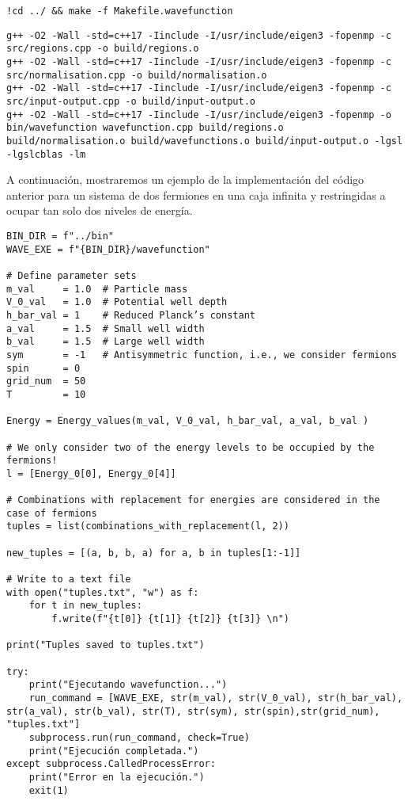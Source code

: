 \documentclass[11pt]{article}
\begin{document}
\begin{verbatim}
!cd ../ && make -f Makefile.wavefunction
\end{verbatim}

\label{orga623997}
\begin{verbatim}
g++ -O2 -Wall -std=c++17 -Iinclude -I/usr/include/eigen3 -fopenmp -c src/regions.cpp -o build/regions.o
g++ -O2 -Wall -std=c++17 -Iinclude -I/usr/include/eigen3 -fopenmp -c src/normalisation.cpp -o build/normalisation.o
g++ -O2 -Wall -std=c++17 -Iinclude -I/usr/include/eigen3 -fopenmp -c src/input-output.cpp -o build/input-output.o
g++ -O2 -Wall -std=c++17 -Iinclude -I/usr/include/eigen3 -fopenmp -o bin/wavefunction wavefunction.cpp build/regions.o build/normalisation.o build/wavefunctions.o build/input-output.o -lgsl -lgslcblas -lm
\end{verbatim}

A continuación, mostraremos un ejemplo de la implementación del código anterior
para un sistema de dos fermiones en una caja infinita y restringidas a ocupar
tan solo dos niveles de energía.
\begin{verbatim}
BIN_DIR = f"../bin"
WAVE_EXE = f"{BIN_DIR}/wavefunction"

# Define parameter sets
m_val     = 1.0  # Particle mass
V_0_val   = 1.0  # Potential well depth
h_bar_val = 1    # Reduced Planck’s constant
a_val     = 1.5  # Small well width
b_val     = 1.5  # Large well width
sym       = -1   # Antisymmetric function, i.e., we consider fermions
spin      = 0
grid_num  = 50
T         = 10

Energy = Energy_values(m_val, V_0_val, h_bar_val, a_val, b_val )

# We only consider two of the energy levels to be occupied by the fermions!
l = [Energy_0[0], Energy_0[4]]

# Combinations with replacement for energies are considered in the case of fermions
tuples = list(combinations_with_replacement(l, 2))

new_tuples = [(a, b, b, a) for a, b in tuples[1:-1]]

# Write to a text file
with open("tuples.txt", "w") as f:
    for t in new_tuples:
        f.write(f"{t[0]} {t[1]} {t[2]} {t[3]} \n")

print("Tuples saved to tuples.txt")

try:
    print("Ejecutando wavefunction...")
    run_command = [WAVE_EXE, str(m_val), str(V_0_val), str(h_bar_val), str(a_val), str(b_val), str(T), str(sym), str(spin),str(grid_num), "tuples.txt"]
    subprocess.run(run_command, check=True)
    print("Ejecución completada.")
except subprocess.CalledProcessError:
    print("Error en la ejecución.")
    exit(1)
\end{verbatim}
\end{document}
